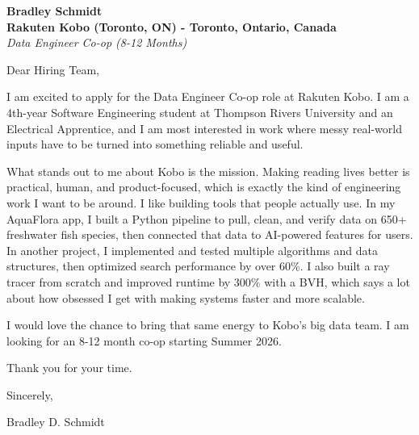 \documentclass[11pt]{article}
\begin{document}
\textbf{Bradley Schmidt}\\
\vspace{0.5em}
\textbf{Rakuten Kobo (Toronto, ON) - Toronto, Ontario, Canada}\\
\textit{Data Engineer Co-op (8-12 Months)}

Dear Hiring Team,

\par

I am excited to apply for the Data Engineer Co-op role at Rakuten Kobo. I am a 4th-year Software Engineering student at Thompson Rivers University and an Electrical Apprentice, and I am most interested in work where messy real-world inputs have to be turned into something reliable and useful.

\par

What stands out to me about Kobo is the mission. Making reading lives better is practical, human, and product-focused, which is exactly the kind of engineering work I want to be around. I like building tools that people actually use. In my AquaFlora app, I built a Python pipeline to pull, clean, and verify data on 650+ freshwater fish species, then connected that data to AI-powered features for users. In another project, I implemented and tested multiple algorithms and data structures, then optimized search performance by over 60\%. I also built a ray tracer from scratch and improved runtime by 300\% with a BVH, which says a lot about how obsessed I get with making systems faster and more scalable.

\par

I would love the chance to bring that same energy to Kobo's big data team. I am looking for an 8-12 month co-op starting Summer 2026.

\par

Thank you for your time.

\par

Sincerely,

\par

Bradley D. Schmidt
\end{document}
